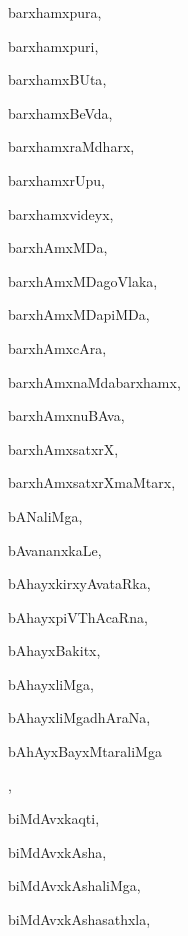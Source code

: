 \begin{multicols}{3}
{\noindent
{barxhamxpura}, \pageref{barxhamxpura}

\noindent
{barxhamxpuri}, \pageref{barxhamxpuri}

\noindent
{barxhamxBUta}, \pageref{barxhamxBUta}

\noindent
{barxhamxBeVda}, \pageref{barxhamxBeVda}

\noindent
{barxhamxraMdharx}, \pageref{barxhamxraMdharx}

\noindent
{barxhamxrUpu}, \pageref{barxhamxrUpu}

\noindent
{barxhamxvideyx}, \pageref{barxhamxvideyx}

\noindent
{barxhAmxMDa}, \pageref{barxhAmxMDa}

\noindent
{barxhAmxMDagoVlaka}, \pageref{barxhAmxMDagoVlaka}

\noindent
{barxhAmxMDapiMDa}, \pageref{barxhAmxMDapiMDa}

\noindent
{barxhAmxcAra}, \pageref{barxhAmxcAra}

\noindent
{barxhAmxnaMdabarxhamx}, \pageref{barxhAmxnaMdabarxhamx}

\noindent
{barxhAmxnuBAva}, \pageref{barxhAmxnuBAva}

\noindent
{barxhAmxsatxrX}, \pageref{barxhAmxsatxrX}

\noindent
{barxhAmxsatxrXmaMtarx}, \pageref{barxhAmxsatxrXmaMtarx}

\noindent
{bANaliMga}, \pageref{bANaliMga}

\noindent
{bAvananxkaLe}, \pageref{bAvananxkaLe}

\noindent
{bAhayxkirxyAvataRka}, \pageref{bAhayxkirxyAvataRka}

\noindent
{bAhayxpiVThAcaRna}, \pageref{bAhayxpiVThAcaRna}

\noindent
{bAhayxBakitx}, \pageref{bAhayxBakitx}

\noindent
{bAhayxliMga}, \pageref{bAhayxliMga}

\noindent
{bAhayxliMgadhAraNa}, \pageref{bAhayxliMgadhAraNa}

\noindent
{bAhAyxBayxMtaraliMga}

\noindent
{}, \pageref{bAhAyxBayxMtaraliMgasaMyoVgasathxla}

\noindent
{biMdAvxkaqti}, \pageref{biMdAvxkaqti}

\noindent
{biMdAvxkAsha}, \pageref{biMdAvxkAsha}

\noindent
{biMdAvxkAshaliMga}, \pageref{biMdAvxkAshaliMga}

\noindent
{biMdAvxkAshasathxla}, \pageref{biMdAvxkAshasathxla}

}
\end{multicols}
